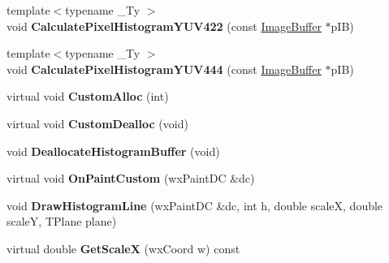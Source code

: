 \begin{DoxyCompactItemize}
\item 
\hypertarget{class_histogram_canvas_a47f5c6c78bfe51932b03e35a8fcd96a3}{{\footnotesize template$<$typename \+\_\+\+Ty $>$ }\\void {\bfseries Calculate\+Pixel\+Histogram\+Y\+U\+V422} (const \hyperlink{struct_image_buffer}{Image\+Buffer} $\ast$p\+I\+B)}\label{class_histogram_canvas_a47f5c6c78bfe51932b03e35a8fcd96a3}

\item 
\hypertarget{class_histogram_canvas_a116735f5a417eef7e2400a3811aaf516}{{\footnotesize template$<$typename \+\_\+\+Ty $>$ }\\void {\bfseries Calculate\+Pixel\+Histogram\+Y\+U\+V444} (const \hyperlink{struct_image_buffer}{Image\+Buffer} $\ast$p\+I\+B)}\label{class_histogram_canvas_a116735f5a417eef7e2400a3811aaf516}

\item 
\hypertarget{class_histogram_canvas_a65b7135f7246bd63670da4d75a151827}{virtual void {\bfseries Custom\+Alloc} (int)}\label{class_histogram_canvas_a65b7135f7246bd63670da4d75a151827}

\item 
\hypertarget{class_histogram_canvas_a9441fa0b0676f4b515a4c297b6a61df8}{virtual void {\bfseries Custom\+Dealloc} (void)}\label{class_histogram_canvas_a9441fa0b0676f4b515a4c297b6a61df8}

\item 
\hypertarget{class_histogram_canvas_ab918fa9e8fad86d78cefd6ebba35b2c5}{void {\bfseries Deallocate\+Histogram\+Buffer} (void)}\label{class_histogram_canvas_ab918fa9e8fad86d78cefd6ebba35b2c5}

\item 
\hypertarget{class_histogram_canvas_a5402fb0be7a8568ca046aaae9e9ff67d}{virtual void {\bfseries On\+Paint\+Custom} (wx\+Paint\+D\+C \&dc)}\label{class_histogram_canvas_a5402fb0be7a8568ca046aaae9e9ff67d}

\item 
\hypertarget{class_histogram_canvas_a1ab01d6e7c9ae4fb0fcad2307a81d716}{void {\bfseries Draw\+Histogram\+Line} (wx\+Paint\+D\+C \&dc, int h, double scale\+X, double scale\+Y, T\+Plane plane)}\label{class_histogram_canvas_a1ab01d6e7c9ae4fb0fcad2307a81d716}

\item 
\hypertarget{class_histogram_canvas_a4fbe52755fd75104d52d42829c8957fd}{virtual double {\bfseries Get\+Scale\+X} (wx\+Coord w) const }\label{class_histogram_canvas_a4fbe52755fd75104d52d42829c8957fd}


\end{DoxyCompactItemize}
